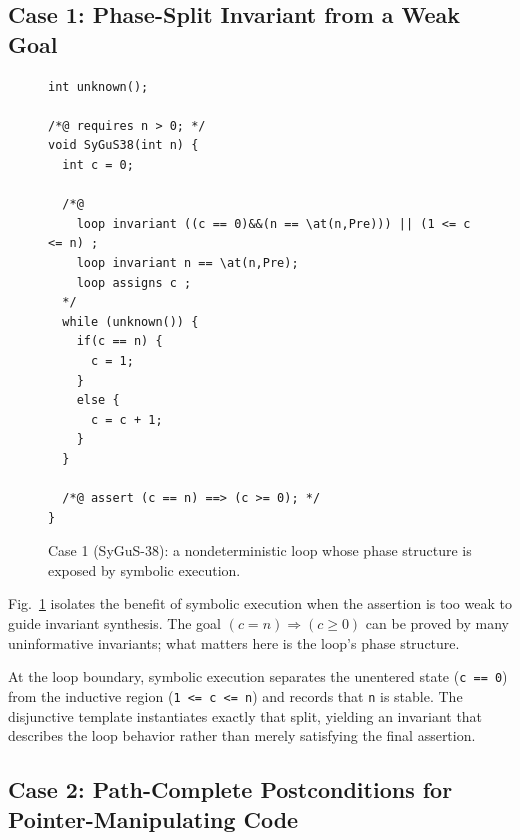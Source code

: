 \subsection{Case 1: Phase-Split Invariant from a Weak Goal}

\begin{figure}[!t]
    \centering
    \begin{tcolorbox}[casebox, title={Case 1: symbolic state exposes loop phases}]
\begin{lstlisting}[style=caseinnerstyle]
int unknown();

/*@ requires n > 0; */
void SyGuS38(int n) {
  int c = 0;

  /*@
    loop invariant ((c == 0)&&(n == \at(n,Pre))) || (1 <= c <= n) ;
    loop invariant n == \at(n,Pre);
    loop assigns c ;
  */
  while (unknown()) {
    if(c == n) {
      c = 1;
    }
    else {
      c = c + 1;
    }
  }

  /*@ assert (c == n) ==> (c >= 0); */
}
\end{lstlisting}
    \end{tcolorbox}
    \caption{Case 1 (SyGuS-38): a nondeterministic loop whose phase structure is exposed by symbolic execution.}
    \label{fig:case1}
\end{figure}

Fig.~\ref{fig:case1} isolates the benefit of symbolic execution when the assertion is too weak to guide invariant synthesis. The goal $(c = n) \Rightarrow (c \ge 0)$ can be proved by many uninformative invariants; what matters here is the loop's phase structure.

At the loop boundary, symbolic execution separates the unentered state (\texttt{c == 0}) from the inductive region (\texttt{1 <= c <= n}) and records that \texttt{n} is stable. The disjunctive template instantiates exactly that split, yielding an invariant that describes the loop behavior rather than merely satisfying the final assertion.

\subsection{Case 2: Path-Complete Postconditions {for Pointer-Manipulating Code}}


